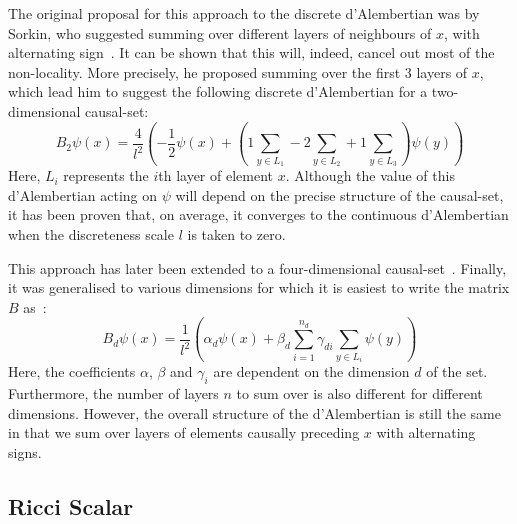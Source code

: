 \documentclass[a4paper,12pt]{article}
\numberwithin{equation}{section}
\begin{document}
The original proposal for this approach to the discrete d'Alembertian was by Sorkin, who suggested summing over different layers of neighbours of $x$, with alternating sign~\cite{Sorkin2009}. It can be shown that this will, indeed, cancel out most of the non-locality. More precisely, he proposed summing over the first $3$ layers of $x$, which lead him to suggest the following discrete d'Alembertian for a two-dimensional causal-set:
\begin{equation}
\label{eq:D'Alembertian2}
B_2 \psi(x)=\frac{4}{l^2}\left(-\frac{1}{2}\psi(x)+\left(1\sum_{y\in L_1}-2\sum_{y\in L_2}+1\sum_{y\in L_3}\right)\psi(y)\right)
\end{equation}
Here, $L_i$ represents the $i$th layer of element $x$. Although the value of this d'Alembertian acting on $\psi$ will depend on the precise structure of the causal-set, it has been proven that, on average, it converges to the continuous d'Alembertian when the discreteness scale $l$ is taken to zero.

This approach has later been extended to a four-dimensional causal-set~\cite{Benincasa2010}. Finally, it was generalised to various dimensions for which it is easiest to write the matrix $B$ as~\cite{Dowker2013}:
\begin{equation}
\label{eq:D'Alembertian3}
B_d \psi(x)=\frac{1}{l^2}\left(\alpha_d \psi(x)+\beta_d \sum_{i=1}^{n_d} \gamma_{d i} \sum_{y\in L_i}\psi(y)\right)
\end{equation}
Here, the coefficients $\alpha$, $\beta$ and $\gamma_i$ are dependent on the dimension $d$ of the set. Furthermore, the number of layers $n$ to sum over is also different for different dimensions. However, the overall structure of the d'Alembertian is still the same in that we sum over layers of elements causally preceding $x$ with alternating signs.


\subsection{Ricci Scalar}
\label{sec:Ricci Scalar2}
\end{document}
